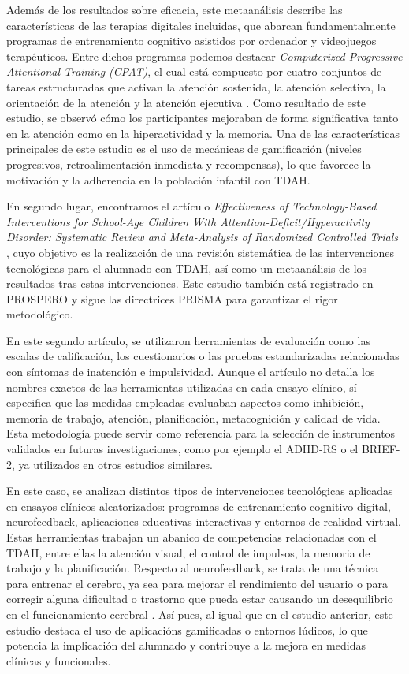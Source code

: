 Además de los resultados sobre eficacia, este metaanálisis describe las características de las terapias digitales incluidas, que abarcan fundamentalmente programas de entrenamiento cognitivo asistidos por ordenador y videojuegos terapéuticos. 
Entre dichos programas podemos destacar \textit{Computerized Progressive Attentional Training (CPAT)}, el cual está compuesto por cuatro conjuntos de tareas estructuradas que activan la atención sostenida, la atención selectiva, la orientación de la atención y la atención ejecutiva \parencite{cpat}.
Como resultado de este estudio, se observó cómo los participantes mejoraban de forma significativa tanto en la atención como en la hiperactividad y la memoria.
Una de las características principales de este estudio es el uso de mecánicas de gamificación (niveles progresivos, retroalimentación inmediata y recompensas), lo que favorece la motivación y la adherencia en la población infantil con TDAH.

En segundo lugar, encontramos el artículo \textit{Effectiveness of Technology-Based Interventions for School-Age Children With Attention-Deficit/Hyperactivity Disorder: Systematic Review and Meta-Analysis of Randomized Controlled Trials} \parencite{meta_digital_adhd}, cuyo objetivo es la realización de una revisión sistemática de las intervenciones tecnológicas para el alumnado con TDAH, así como un metaanálisis de los resultados tras estas intervenciones. 
Este estudio también está registrado en PROSPERO y sigue las directrices PRISMA para garantizar el rigor metodológico.

En este segundo artículo, se utilizaron herramientas de evaluación como las escalas de calificación, los cuestionarios o las pruebas estandarizadas relacionadas con síntomas de inatención e impulsividad. 
Aunque el artículo no detalla los nombres exactos de las herramientas utilizadas en cada ensayo clínico, sí especifica que las medidas empleadas evaluaban aspectos como inhibición, memoria de trabajo, atención, planificación, metacognición y calidad de vida. 
Esta metodología puede servir como referencia para la selección de instrumentos validados en futuras investigaciones, como por ejemplo el ADHD-RS o el BRIEF-2, ya utilizados en otros estudios similares.

En este caso, se analizan distintos tipos de intervenciones tecnológicas aplicadas en ensayos clínicos aleatorizados: programas de entrenamiento cognitivo digital, neurofeedback, aplicaciones educativas interactivas y entornos de realidad virtual. 
Estas herramientas trabajan un abanico de competencias relacionadas con el TDAH, entre ellas la atención visual, el control de impulsos, la memoria de trabajo y la planificación. 
Respecto al neurofeedback, se trata de una técnica para entrenar el cerebro, ya sea para mejorar el rendimiento del usuario o para corregir alguna dificultad o trastorno que pueda estar causando un desequilibrio en el funcionamiento cerebral \parencite{neurofeedback}.
Así pues, al igual que en el estudio anterior, este estudio destaca el uso de aplicacións gamificadas o entornos lúdicos, lo que potencia la implicación del alumnado y contribuye a la mejora en medidas clínicas y funcionales.

